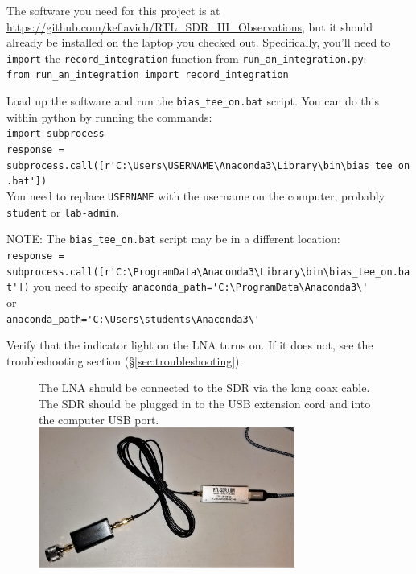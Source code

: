 \documentclass[11pt]{article}
\begin{document}
The software you need for this project is at
\url{https://github.com/keflavich/RTL_SDR_HI_Observations}, but it should
already be installed on the laptop you checked out.  Specifically, you'll need
to \texttt{import} the \texttt{record\_integration} function from
\texttt{run\_an\_integration.py}:\\
\verb|from run_an_integration import record_integration|

Load up the software and run the \texttt{bias\_tee\_on.bat} script.
You can do this within python by running the commands:\\
\verb|import subprocess|\\
\verb|response = subprocess.call([r'C:\Users\USERNAME\Anaconda3\Library\bin\bias_tee_on.bat'])|\\
You need to replace \texttt{USERNAME} with the username on the computer,
probably \texttt{student} or \texttt{lab-admin}.

NOTE: The \verb|bias_tee_on.bat| script may be in a different location:\\
\verb|response = subprocess.call([r'C:\ProgramData\Anaconda3\Library\bin\bias_tee_on.bat'])|
you need to specify \verb|anaconda_path='C:\ProgramData\Anaconda3\'|\\
or\\
\verb|anaconda_path='C:\Users\students\Anaconda3\'|


Verify that the indicator light on the LNA turns on.
If it does not, see the troubleshooting section (\S \ref{sec:troubleshooting}).

\begin{figure}[htp]
    \centering
    The LNA should be connected to the SDR via the long coax cable.  The SDR should be plugged in
    to the USB extension cord and into the computer USB port.\\
    \includegraphics[width=0.75\textwidth]{RadioLabPhotos/adapter_to_lna_to_cable_to_sdr.jpg}
\end{figure}
\end{document}
